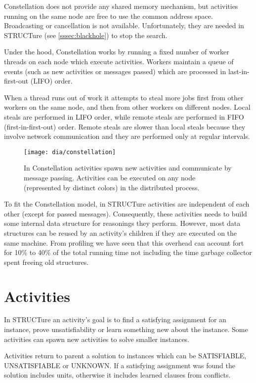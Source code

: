 Constellation does not provide any shared memory mechanism,
but activities running on the same node are free to use the
common address space. Broadcasting or cancellation is not
available. Unfortunately, they are needed in STRUCTure (see
\ref{sssec:blackhole}) to stop the search.

Under the hood, Constellation works by running a fixed number of
worker threads on each node which execute activities.  Workers
maintain a queue of events (such as new activities or messages
passed) which are processed in last-in-first-out (LIFO) order.

When a thread runs out of work it attempts to steal more
jobs first from other workers on the same node, and then from
other workers on different nodes.  Local steals are performed
in LIFO order, while remote steals are performed in FIFO
(first-in-first-out) order. Remote steals are
slower than local steals because they involve network communication
and they are performed only at regular intervals.

\begin{figure}
  \centering
  \texttt{[image: dia/constellation]}
  \caption{In Constellation activities spawn new
  activities and communicate by message passing.
  Activities can be executed on any node (represented by
  distinct colors) in the distributed process.}
  \label{fig:constellation}
\end{figure}


To fit the Constellation model, in STRUCTure activities are
independent of each other (except for passed messages). Consequently,
these activities needs to build some internal data structure for
reasonings they perform. However, most data structures can be
reused by an activity's children if they are executed on the same
machine. From profiling we have seen that this overhead can account
fort for 10\% to 40\% of the total running time not including the
time garbage collector spent freeing old structures.

\section{Activities}

In STRUCTure an activity's goal is to find a satisfying assignment
for an instance, prove unsatisfiability or learn something new
about the instance. Some activities can spawn new activities to
solve smaller instances.

Activities return to parent a solution to instances which can be
\textsf{SATISFIABLE}, \textsf{UNSATISFIABLE} or \textsf{UNKNOWN}. If
a satisfying assignment was found the solution includes units,
otherwise it includes learned clauses from conflicts.

